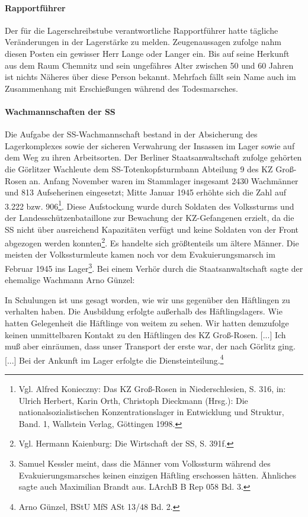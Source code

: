 \paragraph{Rapportführer}
Der für die Lagerschreibstube verantwortliche Rapportführer hatte tägliche Veränderungen in der Lagerstärke zu melden. Zeugenaussagen zufolge nahm diesen Posten ein gewisser Herr Lange oder Langer ein. Bis auf seine Herkunft aus dem Raum Chemnitz und sein ungefähres Alter zwischen 50 und 60 Jahren ist nichts Näheres über diese Person bekannt. Mehrfach fällt sein Name auch im Zusammenhang mit Erschießungen während des Todesmarsches.


\paragraph{Wachmannschaften der SS} Die Aufgabe der SS-Wachmannschaft bestand in der Absicherung des Lagerkomplexes sowie der sicheren Verwahrung der Insassen im Lager sowie auf dem Weg zu ihren Arbeitsorten.
Der Berliner Staatsanwaltschaft zufolge gehörten die Görlitzer Wachleute dem SS-Totenkopfsturmbann Abteilung 9 des KZ Groß-Rosen an. Anfang November waren im Stammlager insgesamt 2430 Wachmänner und 813 Aufseherinen eingesetzt; Mitte Januar 1945 erhöhte sich die Zahl auf 3.222 bzw. 906\footnote{Vgl. Alfred Konieczny: Das KZ Groß-Rosen in Niederschlesien, S. 316, in: Ulrich Herbert, Karin Orth, Christoph Dieckmann (Hrsg.): Die nationalsozialistischen Konzentrationslager in Entwicklung und Struktur, Band. 1, Wallstein Verlag, Göttingen 1998.}. Diese Aufstockung wurde durch Soldaten des Volkssturms und der Landesschützenbataillone zur Bewachung der KZ-Gefangenen erzielt, da die SS nicht über ausreichend Kapazitäten verfügt und keine Soldaten von der Front abgezogen werden konnten\footnote{Vgl. Hermann Kaienburg: Die Wirtschaft der SS, S. 391f.}.
Es handelte sich größtenteils um ältere Männer. Die meisten der Volkssturmleute kamen noch vor dem Evakuierungsmarsch im Februar 1945 ins Lager\footnote{Samuel Kessler meint, dass die Männer vom Volkssturm während des Evakuierungsmarsches keinen einzigen Häftling erschossen hätten. Ähnliches sagte auch Maximilian Brandt aus. LArchB B Rep 058 Bd. 3.}. Bei einem Verhör durch die Staatsanwaltschaft sagte der ehemalige Wachmann Arno Günzel:

\begin{leftbar}
In Schulungen ist uns gesagt worden, wie wir uns gegenüber den Häftlingen zu verhalten haben. Die Ausbildung erfolgte außerhalb des Häftlingslagers. Wie hatten Gelegenheit die Häftlinge von weitem zu sehen. Wir hatten demzufolge keinen unmittelbaren Kontakt zu den Häftlingen des KZ Groß-Rosen. [...] Ich muß aber einräumen, dass unser Transport der erste war, der nach Görlitz ging. [...] Bei der Ankunft im Lager erfolgte die Diensteinteilung.\footnote{Arno Günzel, BStU MfS ASt 13/48 Bd. 2.}
\end{leftbar}

